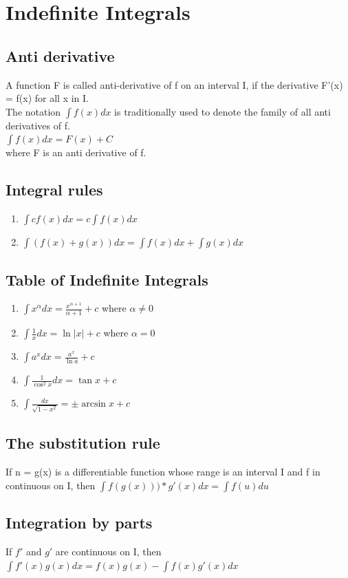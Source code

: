 \documentclass{article}
\begin{document}
\section{Indefinite Integrals}
\subsection{Anti derivative}
A function F is called anti-derivative of f on an interval I, if the derivative F'(x) = f(x) for all x in I.
\\ 
The notation $\int f(x)dx$ is traditionally used to denote the family of all anti derivatives of f. \\
$\int f(x)dx = F(x) + C$ \\
where F is an anti derivative of f.\\
\subsection{Integral rules}
\begin{enumerate}
	\item $\int cf(x)dx = c\int f(x)dx$
	\item $\int (f(x) + g(x))dx = \int f(x)dx + \int g(x)dx$
\end{enumerate}
\pagebreak
\subsection{Table of Indefinite Integrals}
\begin{enumerate}
	\item $\int x^\alpha dx= \frac{x^{\alpha + 1}}{\alpha + 1} + c$ where $\alpha \neq 0$
	\item $\int \frac{1}{x}dx = \ln |x| + c$ where $\alpha = 0$
	\item $\int a^x dx = \frac{a^x}{\ln a} + c$
	\item $\int\frac{1}{\cos^2x}dx = \tan x + c$
	\item $\int\frac{dx}{\sqrt{1-x^2}} = \pm\arcsin x + c$ 
\end{enumerate}

\subsection{The substitution rule}
If n = g(x) is a differentiable function whose range is an interval I and f in continuous on I, then $\int f(g(x))) * g'(x)dx = \int f(u)du$\\

\subsection{Integration by parts}
If $f'$ and $g'$  are continuous on I, then $\int f'(x)g(x)dx = f(x)g(x) - \int f(x)g'(x)dx$

 
 
 
\end{document}
